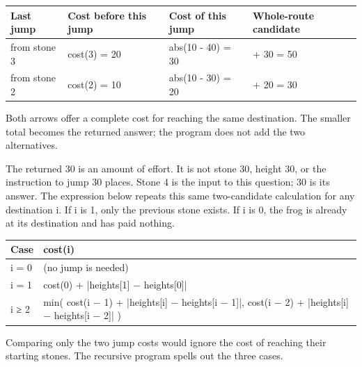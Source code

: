 \documentclass[11pt,a4paper,oneside]{report}
\newcommand{\picturecaption}[1]{\par{\small\color{quiet}#1}\par\medskip}
\begin{document}
\par\medskip\begingroup\small\setlength{\tabcolsep}{4pt}\renewcommand{\arraystretch}{1.3}\begin{tabularx}{\linewidth}{>{\raggedright\arraybackslash}X>{\raggedright\arraybackslash}X>{\raggedright\arraybackslash}X>{\raggedright\arraybackslash}X}\toprule\textbf{Last jump} & \textbf{Cost before this jump} & \textbf{Cost of this jump} & \textbf{Whole-route candidate}\\\midrule
{}from stone 3 & cost(3) = 20 & abs(10 - 40) = 30 & 20 + 30 = 50\\
{}from stone 2 & cost(2) = 10 & abs(10 - 30) = 20 & 10 + 20 = 30\\
\bottomrule\end{tabularx}\endgroup\par\medskip
{}\begin{center}\end{center}\picturecaption{Both arrows offer a complete cost for reaching the same destination. The smaller total becomes the returned answer; the program does not add the two alternatives.}
The returned 30 is an amount of effort. It is not stone 30, height 30, or the instruction to jump 30 places. Stone 4 is the input to this question; 30 is its answer. The expression below repeats this same two-candidate calculation for any destination i. If i is 1, only the previous stone exists. If i is 0, the frog is already at its destination and has paid nothing.

\par\medskip\begingroup\small\setlength{\tabcolsep}{4pt}\renewcommand{\arraystretch}{1.3}\begin{tabularx}{\linewidth}{>{\raggedright\arraybackslash}p{16mm}>{\raggedright\arraybackslash}X}\toprule\textbf{Case} & \textbf{cost(i)}\\\midrule
{}i = 0 & 0 (no jump is needed)\\
{}i = 1 & cost(0) + |heights[1] − heights[0]|\\
{}i ≥ 2 & min( cost(i − 1) + |heights[i] − heights[i − 1]|,  cost(i − 2) + |heights[i] − heights[i − 2]| )\\
\bottomrule\end{tabularx}\endgroup\par\medskip
Comparing only the two jump costs would ignore the cost of reaching their starting stones. The recursive program spells out the three cases.
\end{document}
